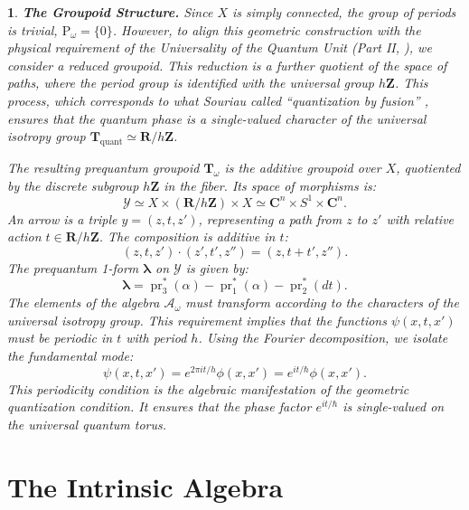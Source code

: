 \documentclass[11pt,reqno,letterpaper,twoside]{amsart}
\theoremstyle{articlestyle}
\newtheorem{article}{}
\theoremstyle{plain}
\theoremstyle{definition}
\def\artlabel[#1]{\textbf{#1.}}
\newcommand{\RR}{\mathbf{R}}
\newcommand{\ZZ}{\mathbf{Z}}
\newcommand{\CC}{\mathbf{C}}
\newcommand{\TT}{\mathbf{T}}
\newcommand{\cA}{{\mathcal A}}
\newcommand{\cY}{{\mathcal Y}}
\newcommand{\blambda}{{\pmb{\lambda}}}
\DeclareMathOperator{\pr}{pr}
\newcommand{\0}{\hat{0}}
\newcommand{\1}{\hat{1}}
\newcommand{\Pomega}{\mathrm{P}_\omega}
\begin{document}
\begin{article}\artlabel[The Groupoid Structure]
    Since $X$ is simply connected,
    the group of periods is trivial, $\Pomega = \{0\}$.
    However,
    to align this geometric construction with the physical requirement of the \emph{Universality of the Quantum Unit} (Part II, ),
    we consider a reduced groupoid.
    This reduction is a further quotient of the space of paths,
    where the period group is identified with the universal group $h\ZZ$.
    This process,
    which corresponds to what Souriau called ``quantization by fusion'' \cite[]{Sou70},
    ensures that the quantum phase is a single-valued character of the universal isotropy group $\TT_{\text{quant}} \simeq \RR/h\ZZ$.
    
    The resulting prequantum groupoid $\TT_\omega$ is the additive groupoid over $X$,
    quotiented by the discrete subgroup $h\ZZ$ in the fiber.
    Its space of morphisms is:
    $$
      \cY \simeq X \times (\RR/h\ZZ) \times X \simeq \CC^n \times S^1 \times \CC^n.
    $$
    An arrow is a triple $y = (z, t, z')$,
    representing a path from $z$ to $z'$ with relative action $t \in \RR/h\ZZ$.
    The composition is additive in $t$:
    $$
      (z, t, z') \cdot (z', t', z'') = (z, t + t', z'').
    $$
    The prequantum 1-form $\blambda$ on $\cY$ is given by:
    $$
      \blambda = \pr_3^*(\alpha) - \pr_1^*(\alpha) - \pr_2^*(dt).
    $$
    The elements of the algebra $\cA_\omega$ must transform according to the characters of the universal isotropy group.
    This requirement implies that the functions $\psi(x, t, x')$ must be periodic in $t$ with period $h$.
    Using the Fourier decomposition,
    we isolate the fundamental mode:
    $$
      \psi(x, t, x') = e^{2\pi i t / h} \phi(x, x') = e^{i t / \hbar} \phi(x, x').
    $$
    This periodicity condition is the algebraic manifestation of the geometric quantization condition.
    It ensures that the phase factor $e^{it/\hbar}$ is single-valued on the universal quantum torus.
  \end{article}

  
  
  \section{\textbf{The Intrinsic Algebra}}
  \label{sec:IntrinsicAlgebra}
  
\end{document}
